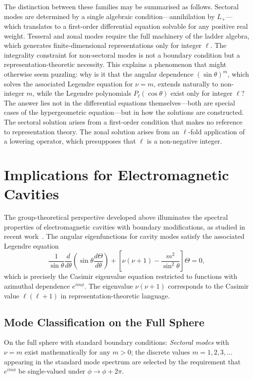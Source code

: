 \documentclass[
  aip,
  amsmath,amssymb,
  preprint
]{revtex4-1}
\begin{document}
The distinction between these families may be summarised as follows. Sectoral modes are determined by a single algebraic condition---annihilation by $L_+$---which translates to a first-order differential equation solvable for any positive real weight. Tesseral and zonal modes require the full machinery of the ladder algebra, which generates finite-dimensional representations only for integer $\ell$. The integrality constraint for non-sectoral modes is not a boundary condition but a representation-theoretic necessity. This explains a phenomenon that might otherwise seem puzzling: why is it that the angular dependence $(\sin\theta)^m$, which solves the associated Legendre equation for $\nu = m$, extends naturally to non-integer $m$, while the Legendre polynomials $P_\ell(\cos\theta)$ exist only for integer $\ell$? The answer lies not in the differential equations themselves---both are special cases of the hypergeometric equation---but in how the solutions are constructed. The sectoral solution arises from a first-order condition that makes no reference to representation theory. The zonal solution arises from an $\ell$-fold application of a lowering operator, which presupposes that $\ell$ is a non-negative integer.

\section{Implications for Electromagnetic Cavities}
\label{sec:cavities}
The group-theoretical perspective developed above illuminates the spectral properties of electromagnetic cavities with boundary modifications, as studied in recent work~\cite{BakrAmari2025}. The angular eigenfunctions for cavity modes satisfy the associated Legendre equation
\begin{equation}
\frac{1}{\sin\theta}\frac{d}{d\theta}\left(\sin\theta\frac{d\Theta}{d\theta}\right) 
+ \left[\nu(\nu+1) - \frac{m^2}{\sin^2\theta}\right]\Theta = 0,
\label{eq:legendre}
\end{equation}
which is precisely the Casimir eigenvalue equation restricted to functions with azimuthal dependence $e^{im\phi}$. The eigenvalue $\nu(\nu+1)$ corresponds to the Casimir value $\ell(\ell+1)$ in representation-theoretic language.

\subsection{Mode Classification on the Full Sphere}
On the full sphere with standard boundary conditions:
\noindent \textit{Sectoral modes} with $\nu = m$ exist mathematically for any $m > 0$; the discrete values $m = 1, 2, 3, \ldots$ appearing in the standard mode spectrum are selected by the requirement that $e^{im\phi}$ be single-valued under $\phi \to \phi + 2\pi$. 
\end{document}
